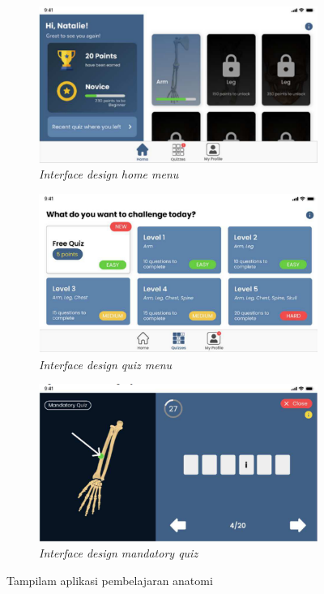 \begin{figure}[H]
	\centering
	\begin{subfigure}[b]{0.4\textwidth}
		\centering
	  \includegraphics[width=\linewidth]{contents/chapter-2/images/Deta-a1.png}
	  \caption{\textit{Interface design home menu}}
	  \label{fig:sub-deta-a1}
	\end{subfigure}
	\begin{subfigure}[b]{0.4\textwidth}
	\centering
	  \includegraphics[width=\linewidth]{contents/chapter-2/images/Deta-a2.png}
	  \caption{\textit{Interface design quiz menu }}
	  \label{fig:sub-deta-a2}
	\end{subfigure}
	\hfill
	\begin{subfigure}[b]{0.4\textwidth}
		\centering
		\includegraphics[width=\linewidth]{contents/chapter-2/images/Deta-a3.png}
		\caption{\textit{Interface design mandatory quiz}}
		\label{fig:sub-deta-a3}
	\end{subfigure}  
	\caption{Tampilam aplikasi pembelajaran anatomi \cite{AnatomyGamification}}
	\label{fig:interface pembelajaran anatomi}
  \end{figure}

